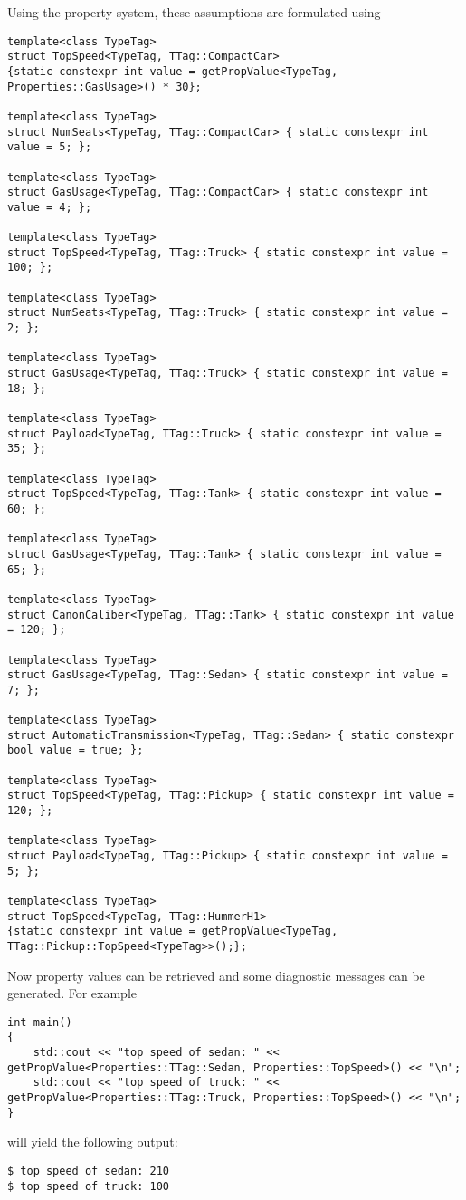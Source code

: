 \noindent
Using the \Dumux property system, these assumptions are formulated
using
\begin{lstlisting}[name=propsyscars,style=DumuxCode]
template<class TypeTag>
struct TopSpeed<TypeTag, TTag::CompactCar>
{static constexpr int value = getPropValue<TypeTag, Properties::GasUsage>() * 30};

template<class TypeTag>
struct NumSeats<TypeTag, TTag::CompactCar> { static constexpr int value = 5; };

template<class TypeTag>
struct GasUsage<TypeTag, TTag::CompactCar> { static constexpr int value = 4; };

template<class TypeTag>
struct TopSpeed<TypeTag, TTag::Truck> { static constexpr int value = 100; };

template<class TypeTag>
struct NumSeats<TypeTag, TTag::Truck> { static constexpr int value = 2; };

template<class TypeTag>
struct GasUsage<TypeTag, TTag::Truck> { static constexpr int value = 18; };

template<class TypeTag>
struct Payload<TypeTag, TTag::Truck> { static constexpr int value = 35; };

template<class TypeTag>
struct TopSpeed<TypeTag, TTag::Tank> { static constexpr int value = 60; };

template<class TypeTag>
struct GasUsage<TypeTag, TTag::Tank> { static constexpr int value = 65; };

template<class TypeTag>
struct CanonCaliber<TypeTag, TTag::Tank> { static constexpr int value = 120; };

template<class TypeTag>
struct GasUsage<TypeTag, TTag::Sedan> { static constexpr int value = 7; };

template<class TypeTag>
struct AutomaticTransmission<TypeTag, TTag::Sedan> { static constexpr bool value = true; };

template<class TypeTag>
struct TopSpeed<TypeTag, TTag::Pickup> { static constexpr int value = 120; };

template<class TypeTag>
struct Payload<TypeTag, TTag::Pickup> { static constexpr int value = 5; };

template<class TypeTag>
struct TopSpeed<TypeTag, TTag::HummerH1>
{static constexpr int value = getPropValue<TypeTag, TTag::Pickup::TopSpeed<TypeTag>>();};
\end{lstlisting}

\noindent
Now property values can be retrieved and some diagnostic messages can
be generated. For example
\begin{lstlisting}[name=propsyscars,style=DumuxCode]
int main()
{
    std::cout << "top speed of sedan: " << getPropValue<Properties::TTag::Sedan, Properties::TopSpeed>() << "\n";
    std::cout << "top speed of truck: " << getPropValue<Properties::TTag::Truck, Properties::TopSpeed>() << "\n";
}
\end{lstlisting}
will yield the following output:
\begin{lstlisting}[style=Bash, basicstyle=\ttfamily\scriptsize\let\textcolor\textcolordummy]
$ top speed of sedan: 210
$ top speed of truck: 100
\end{lstlisting}

